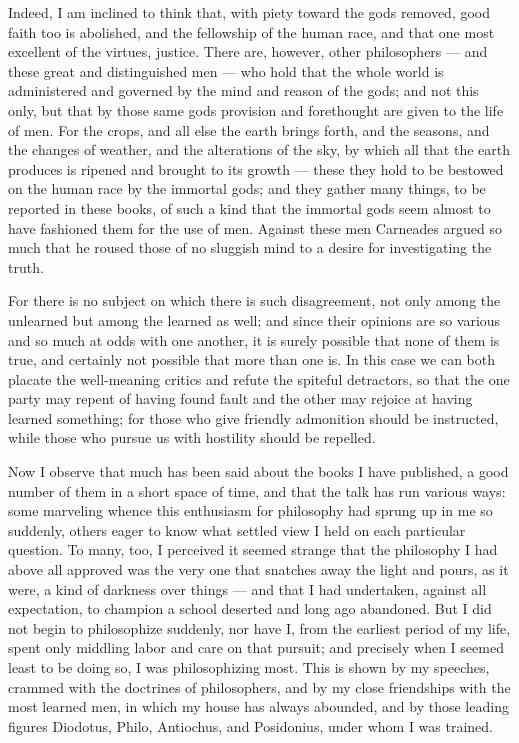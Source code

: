  Indeed, I am inclined to think that, with piety toward the gods removed, good faith too is abolished, and the fellowship of the human race, and that one most excellent of the virtues, justice. There are, however, other philosophers — and these great and distinguished men — who hold that the whole world is administered and governed by the mind and reason of the gods; and not this only, but that by those same gods provision and forethought are given to the life of men. For the crops, and all else the earth brings forth, and the seasons, and the changes of weather, and the alterations of the sky, by which all that the earth produces is ripened and brought to its growth — these they hold to be bestowed on the human race by the immortal gods; and they gather many things, to be reported in these books, of such a kind that the immortal gods seem almost to have fashioned them for the use of men. Against these men Carneades argued so much that he roused those of no sluggish mind to a desire for investigating the truth.

 For there is no subject on which there is such disagreement, not only among the unlearned but among the learned as well; and since their opinions are so various and so much at odds with one another, it is surely possible that none of them is true, and certainly not possible that more than one is. In this case we can both placate the well-meaning critics and refute the spiteful detractors, so that the one party may repent of having found fault and the other may rejoice at having learned something; for those who give friendly admonition should be instructed, while those who pursue us with hostility should be repelled.

 Now I observe that much has been said about the books I have published, a good number of them in a short space of time, and that the talk has run various ways: some marveling whence this enthusiasm for philosophy had sprung up in me so suddenly, others eager to know what settled view I held on each particular question. To many, too, I perceived it seemed strange that the philosophy I had above all approved was the very one that snatches away the light and pours, as it were, a kind of darkness over things — and that I had undertaken, against all expectation, to champion a school deserted and long ago abandoned. But I did not begin to philosophize suddenly, nor have I, from the earliest period of my life, spent only middling labor and care on that pursuit; and precisely when I seemed least to be doing so, I was philosophizing most. This is shown by my speeches, crammed with the doctrines of philosophers, and by my close friendships with the most learned men, in which my house has always abounded, and by those leading figures Diodotus, Philo, Antiochus, and Posidonius, under whom I was trained.

